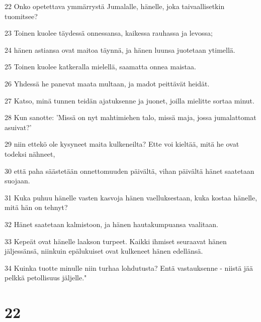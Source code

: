 \par 22 Onko opetettava ymmärrystä Jumalalle, hänelle, joka taivaallisetkin tuomitsee?
\par 23 Toinen kuolee täydessä onnessansa, kaikessa rauhassa ja levossa;
\par 24 hänen astiansa ovat maitoa täynnä, ja hänen luunsa juotetaan ytimellä.
\par 25 Toinen kuolee katkeralla mielellä, saamatta onnea maistaa.
\par 26 Yhdessä he panevat maata multaan, ja madot peittävät heidät.
\par 27 Katso, minä tunnen teidän ajatuksenne ja juonet, joilla mielitte sortaa minut.
\par 28 Kun sanotte: 'Missä on nyt mahtimiehen talo, missä maja, jossa jumalattomat asuivat?'
\par 29 niin ettekö ole kysyneet maita kulkeneilta? Ette voi kieltää, mitä he ovat todeksi nähneet,
\par 30 että paha säästetään onnettomuuden päivältä, vihan päivältä hänet saatetaan suojaan.
\par 31 Kuka puhuu hänelle vasten kasvoja hänen vaelluksestaan, kuka kostaa hänelle, mitä hän on tehnyt?
\par 32 Hänet saatetaan kalmistoon, ja hänen hautakumpuansa vaalitaan.
\par 33 Kepeät ovat hänelle laakson turpeet. Kaikki ihmiset seuraavat hänen jäljessänsä, niinkuin epälukuiset ovat kulkeneet hänen edellänsä.
\par 34 Kuinka tuotte minulle niin turhaa lohdutusta? Entä vastauksenne - niistä jää pelkkä petollisuus jäljelle."

\chapter{22}

